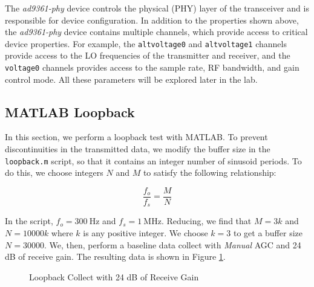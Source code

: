 \documentclass{article}
\begin{document}
The \textit{ad9361-phy} device controls the physical (PHY) layer of the transceiver and is responsible for device configuration. In addition to the properties shown above, the \textit{ad9361-phy} device contains multiple channels, which provide access to critical device properties. For example, the \texttt{altvoltage0} and \texttt{altvoltage1} channels provide access to the LO frequencies of the transmitter and receiver, and the \texttt{voltage0} channels provides access to the sample rate, RF bandwidth, and gain control mode. All these parameters will be explored later in the lab.


\subsection{MATLAB Loopback}
\label{section::matlab_loopback_results}

In this section, we perform a loopback test with MATLAB. To prevent discontinuities in the transmitted data, we modify the buffer size in the \texttt{loopback.m} script, so that it contains an integer number of sinusoid periods. To do this, we choose integers $N$ and $M$ to satisfy the following relationship:

\begin{equation}
	\frac{f_o}{f_s} = \frac{M}{N}
\end{equation} 

In the script, $f_o = 300\ \text{Hz}$ and $f_s = 1\ \text{MHz}$. Reducing, we find that $M = 3k$ and $N = 10000k$ where $k$ is any positive integer. We choose $k=3$ to get a buffer size $N = 30000$. We, then, perform a baseline data collect with \textit{Manual} AGC and 24 dB of receive gain. The resulting data is shown in Figure \ref{fig::matlab_loopback_baseline}.

\begin{figure}[H]
	\centerline{}
	\caption{Loopback Collect with 24 dB of Receive Gain}
	\label{fig::matlab_loopback_baseline}
\end{figure}
\end{document}
